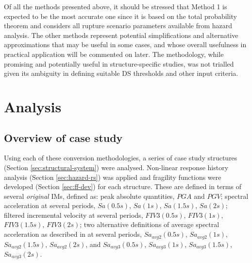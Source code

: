 Of all the methods presented above, it should be stressed that Method 1 is expected to be the most accurate one since it is based on the total probability theorem and considers all rupture scenario parameters available from hazard analysis. The other methods represent potential simplifications and alternative approximations that may be useful in some cases, and whose overall usefulness in practical application will be commented on later. The \citet{KaraferisVamvatsikos2022} methodology, while promising and potentially useful in structure-specific studies, was not trialled given its ambiguity in defining suitable \ac{DS} thresholds and other input criteria.


\section{Analysis}
\subsection{Overview of case study}\label{sec:case-study}
Using each of these conversion methodologies, a series of case study structures (Section \ref{sec:structural-system}) were analysed. Non-linear response history analysis (Section \ref{sec:hazard-rs}) was applied and fragility functions were developed (Section \ref{sec:ff-dev}) for each structure. These are defined in terms of several \textit{original} \acp{IM}, defined as: peak absolute quantities, $PGA$ and $PGV$; spectral acceleration at several periods, $Sa(0.5s)$, $Sa(1s)$, $Sa(1.5s)$, $Sa(2s)$; filtered incremental velocity at several periods, $FIV3(0.5s)$, $FIV3(1s)$, $FIV3(1.5s)$, $FIV3(2s)$; two alternative definitions of average spectral acceleration as described in \citet{Shahnazaryan2024} at several periods, $Sa_{avg2}(0.5s)$, $Sa_{avg2}(1s)$, $Sa_{avg2}(1.5s)$, $Sa_{avg2}(2s)$, and $Sa_{avg3}(0.5s)$, $Sa_{avg3}(1s)$, $Sa_{avg3}(1.5s)$, $Sa_{avg3}(2s)$.

